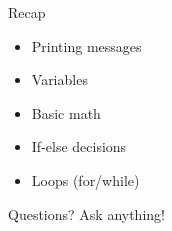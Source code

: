 \begin{frame}{Recap}
    \begin{itemize}
      \item Printing messages
      \item Variables
      \item Basic math
      \item If-else decisions
      \item Loops (for/while)
    \end{itemize}
    
    \begin{block}{Questions?}
      Ask anything!
    \end{block}
  \end{frame}